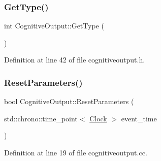 \mbox{\label{class_cognitive_output_ac5ead5e6a98556d6779eda5679b69594}} 
\subsubsection{\texorpdfstring{Get\+Type()}{GetType()}}
{\footnotesize\ttfamily int Cognitive\+Output\+::\+Get\+Type (\begin{DoxyParamCaption}{ }\end{DoxyParamCaption})\hspace{0.3cm}{\ttfamily [inline]}}



Definition at line 42 of file cognitiveoutput.\+h.

\mbox{\label{class_cognitive_output_ab43b79aaadf75d18512c4379a77542cd}} 
\subsubsection{\texorpdfstring{Reset\+Parameters()}{ResetParameters()}}
{\footnotesize\ttfamily bool Cognitive\+Output\+::\+Reset\+Parameters (\begin{DoxyParamCaption}\item[{std\+::chrono\+::time\+\_\+point$<$ \mbox{\hyperlink{universe_8h_a0ef8d951d1ca5ab3cfaf7ab4c7a6fd80}{Clock}} $>$}]{event\+\_\+time }\end{DoxyParamCaption})}



Definition at line 19 of file cognitiveoutput.\+cc.

